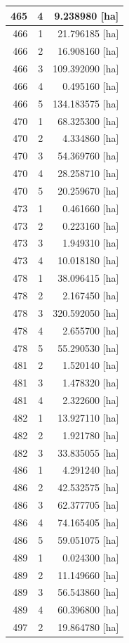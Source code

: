 \documentclass[11pt,]{book}
\begin{document}
\begin{table}
\begin{tabular}[t]{r|r|r}
\hline
465 & 4 & 9.238980 [ha]\\
\hline
466 & 1 & 21.796185 [ha]\\
\hline
466 & 2 & 16.908160 [ha]\\
\hline
466 & 3 & 109.392090 [ha]\\
\hline
466 & 4 & 0.495160 [ha]\\
\hline
466 & 5 & 134.183575 [ha]\\
\hline
470 & 1 & 68.325300 [ha]\\
\hline
470 & 2 & 4.334860 [ha]\\
\hline
470 & 3 & 54.369760 [ha]\\
\hline
470 & 4 & 28.258710 [ha]\\
\hline
470 & 5 & 20.259670 [ha]\\
\hline
473 & 1 & 0.461660 [ha]\\
\hline
473 & 2 & 0.223160 [ha]\\
\hline
473 & 3 & 1.949310 [ha]\\
\hline
473 & 4 & 10.018180 [ha]\\
\hline
478 & 1 & 38.096415 [ha]\\
\hline
478 & 2 & 2.167450 [ha]\\
\hline
478 & 3 & 320.592050 [ha]\\
\hline
478 & 4 & 2.655700 [ha]\\
\hline
478 & 5 & 55.290530 [ha]\\
\hline
481 & 2 & 1.520140 [ha]\\
\hline
481 & 3 & 1.478320 [ha]\\
\hline
481 & 4 & 2.322600 [ha]\\
\hline
482 & 1 & 13.927110 [ha]\\
\hline
482 & 2 & 1.921780 [ha]\\
\hline
482 & 3 & 33.835055 [ha]\\
\hline
486 & 1 & 4.291240 [ha]\\
\hline
486 & 2 & 42.532575 [ha]\\
\hline
486 & 3 & 62.377705 [ha]\\
\hline
486 & 4 & 74.165405 [ha]\\
\hline
486 & 5 & 59.051075 [ha]\\
\hline
489 & 1 & 0.024300 [ha]\\
\hline
489 & 2 & 11.149660 [ha]\\
\hline
489 & 3 & 56.543860 [ha]\\
\hline
489 & 4 & 60.396800 [ha]\\
\hline
497 & 2 & 19.864780 [ha]\\

\end{tabular}
\end{table}
\end{document}
